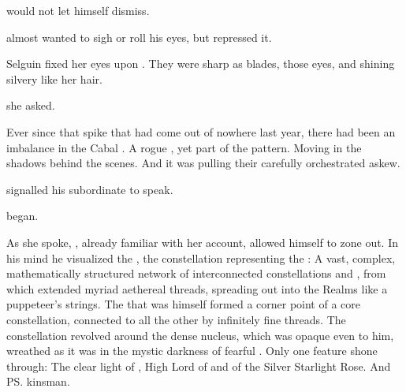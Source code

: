 \begin{garbage}
\Ganethed{} would not let himself dismiss.  

%
\index{\LocarPsyrex}%
\Teshrial{} almost wanted to sigh or roll his eyes, but repressed it. 

Selguin fixed her eyes upon \Teshrial. 
They were sharp as blades, those eyes, and shining silvery like her hair. 


 she asked. 

Ever since that  spike that had come out of nowhere last year, there had been an imbalance in the Cabal \Matrices. 
A rogue \vertex{}, yet part of the pattern. 
Moving in the shadows behind the scenes. 
And it was pulling their carefully orchestrated \matrix{} askew. 


\Teshrial{} signalled his subordinate to speak. 

 \Achsah{} began. 

\index{\Azraid}%
%
As she spoke, \Teshrial, already familiar with her account, allowed himself to zone out. 
In his mind he visualized the , the constellation representing the \KiriathSepher{} \matrix: 
A vast, complex, mathematically structured network of interconnected constellations and \vertices{}, from which extended myriad aethereal threads, spreading out into the Realms like a puppeteer's strings. 
The \vertex{} that was \Teshrial{} himself formed a corner point of a core constellation, connected to all the other \vertices{} by infinitely fine threads. 
The constellation revolved around the dense \matrix{} nucleus, which was opaque even to him, wreathed as it was in the mystic darkness of fearful \Erebos. 
Only one feature shone through: 
The clear light of , High Lord of \CiriathSepher{} and \apex{} of the {Silver Starlight Rose}. 
And \ps{\Teshrial} kinsman. 


\end{garbage}
